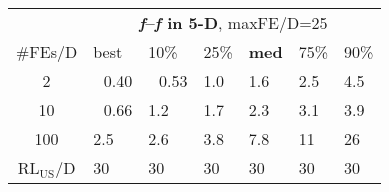 \begin{tabular}{c|llllll}
 & \multicolumn{6}{|c}{\textbf{\textit{f}\raisebox{-0.35ex}{2}--\textit{f}\raisebox{-0.35ex}{24} in 5-D}, maxFE/D=25}\\
\#FEs/D & best & 10\% & 25\% & \textbf{med} & 75\% & 90\%\\
2 & ~\,0.40 & ~\,0.53 & \hspace*{1ex}1.0 & \hspace*{1ex}1.6 & \hspace*{1ex}2.5 & \hspace*{1ex}4.5\\
10 & ~\,0.66 & \hspace*{1ex}1.2 & \hspace*{1ex}1.7 & \hspace*{1ex}2.3 & \hspace*{1ex}3.1 & \hspace*{1ex}3.9\\
100 & \hspace*{1ex}2.5 & \hspace*{1ex}2.6 & \hspace*{1ex}3.8 & \hspace*{1ex}7.8 & 11 & 26\\
$\text{RL}_{\text{US}}$/D & 30 & 30 & 30 & 30 & 30 & 30
\end{tabular}
